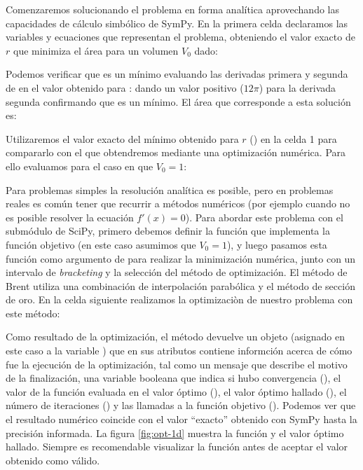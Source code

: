 Comenzaremos solucionando el problema en forma analítica aprovechando las capacidades de cálculo simbólico de SymPy. En la primera celda declaramos las variables y ecuaciones que representan el problema, obteniendo el valor exacto de $r$ que minimiza el área para un volumen $V_0$ dado:

Podemos verificar que es un mínimo evaluando las derivadas primera y segunda de  en el valor obtenido para :
\noindent dando un valor positivo ($12 \pi$) para la derivada segunda confirmando que  es un mínimo. El área que corresponde a esta solución es:

Utilizaremos el valor exacto del mínimo obtenido para $r$ () en la celda 1 para compararlo con el que obtendremos mediante una optimización numérica. Para ello evaluamos  para el caso en que $V_0 = 1$: 

Para problemas simples la resolución analítica es posible, pero en problemas reales es común tener que recurrir a métodos numéricos (por ejemplo cuando no es posible resolver la ecuación $f'(x) = 0$). Para abordar este problema con el submódulo  de SciPy, primero debemos definir la función  que implementa la función objetivo (en este caso asumimos que $V_0 = 1$), y luego pasamos esta función como argumento de  para realizar la minimización numérica, junto con un intervalo de \textit{bracketing} y la selección del método de optimización. El método de Brent utiliza una combinación de interpolación parabólica y el método de sección de oro. En la celda siguiente realizamos la optimizaciòn de nuestro problema con este método:


Como resultado de la optimización, el método devuelve un objeto (asignado en este caso a la variable ) que en sus atributos contiene informción acerca de cómo fue la ejecución de la optimización, tal como un mensaje que describe el motivo de la finalización, una variable booleana que indica si hubo convergencia (), el valor de la función evaluada en el valor óptimo (), el valor óptimo hallado (), el número de iteraciones () y las llamadas a la función objetivo (). Podemos ver que el resultado numérico coincide con el valor ``exacto'' obtenido con SymPy hasta la precisión informada. La figura \ref{fig:opt-1d} muestra la función y el valor óptimo hallado. Siempre es recomendable visualizar la función antes de aceptar el valor obtenido como válido.

